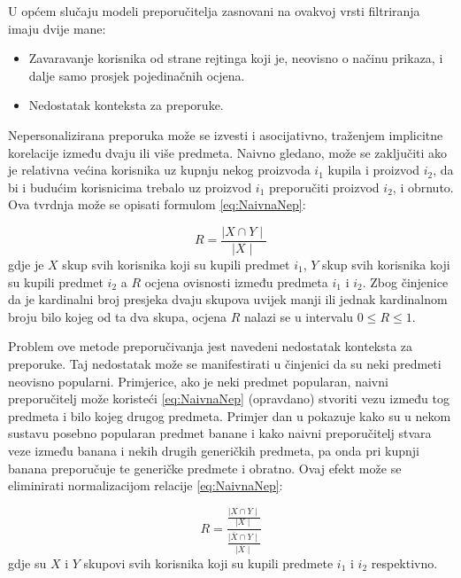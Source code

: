 \documentclass[times, utf8, diplomski, numeric]{fer}
\begin{document}
U općem slučaju modeli preporučitelja zasnovani na ovakvoj vrsti filtriranja
imaju dvije mane:
\begin{itemize}
  \item Zavaravanje korisnika od strane rejtinga koji je, neovisno o načinu
  prikaza, i dalje samo prosjek pojedinačnih ocjena.
  \item Nedostatak konteksta za preporuke.
\end{itemize}

Nepersonalizirana preporuka može se izvesti i asocijativno, traženjem implicitne
korelacije između dvaju ili više predmeta. Naivno gledano, može se zaključiti
ako je relativna većina korisnika uz kupnju nekog proizvoda $i_1$ kupila i
proizvod $i_2$, da bi i budućim korisnicima trebalo uz proizvod $i_1$
preporučiti proizvod $i_2$, i obrnuto. Ova tvrdnja može se opisati formulom
\ref{eq:NaivnaNep}:

\begin{equation}
\label{eq:NaivnaNep}
	R = \frac{\mid X \cap Y \mid}{\mid X \mid}
\end{equation}
gdje je $X$ skup svih korisnika koji su kupili predmet $i_1$, $Y$ skup svih
korisnika koji su kupili predmet $i_2$ a $R$ ocjena ovisnosti između predmeta
$i_1$ i $i_2$. Zbog činjenice da je kardinalni broj presjeka dvaju skupova
uvijek manji ili jednak kardinalnom broju bilo kojeg od ta dva skupa, ocjena $R$
nalazi se u intervalu $0 \leq R \leq 1$.

Problem ove metode preporučivanja jest navedeni nedostatak konteksta za
preporuke. Taj nedostatak može se manifestirati u činjenici da su neki predmeti
neovisno popularni. Primjerice, ako je neki predmet popularan, naivni
preporučitelj može koristeći \ref {eq:NaivnaNep} (opravdano) stvoriti vezu
između tog predmeta i bilo kojeg drugog predmeta. Primjer dan u
\cite{courseraRC} pokazuje kako su u nekom sustavu posebno popularan predmet
banane i kako naivni preporučitelj stvara veze između banana i nekih drugih
generičkih predmeta, pa onda pri kupnji banana preporučuje te generičke predmete
i obratno. Ovaj efekt može se eliminirati normalizacijom relacije
\ref{eq:NaivnaNep}:

\begin{equation}
\label{eq:nepersonalizirani}
	R = \frac
		{\frac
			{\mid X \cap Y \mid}
			{\mid X \mid}}
		{\frac
			{\mid \overline{X} \cap Y\mid}
			{\mid \overline{X} \mid}}
\end{equation}
gdje su $X$ i $Y$ skupovi svih korisnika koji su kupili predmete $i_1$ i $i_2$
respektivno.
\end{document}
